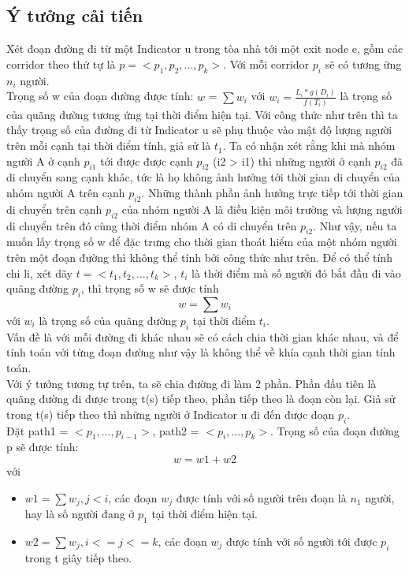 \documentclass{my_style}
\begin{document}
    \subsection{Ý tưởng cải tiến}
    Xét đoạn đường đi từ một Indicator u trong tòa nhà tới một exit 
    node e, gồm các corridor theo thứ tự là $p = <p_{1}, p_{2}, ...,p_{k}
    >$. Với mỗi corridor $p_{i}$ sẽ có tương ững $n_{i}$ người. \\ 
    Trọng số w của đoạn đường được tính: $w$ = $\sum{w_{i}}$ với 
    $w_{i} = \frac{L_{i}*g(D_{i})}{f(T_{i})}$ là trọng số của quãng 
    đường tương ứng tại thời điểm hiện tại. Với công thức như trên 
    thì ta thấy trọng số của đường đi từ Indicator u sẽ phụ thuộc vào mật độ lượng
    người trên mỗi cạnh tại thời điểm tính, giả sử là $t_{1}$.
    Ta có nhận xét rằng khi mà nhóm người A ở cạnh $p_{i1}$ tới 
    được được cạnh $p_{i2}$ (i2 > i1) thì những người ở cạnh 
    $p_{i2}$ đã di chuyển sang cạnh khác, tức là họ không ảnh hưởng 
    tới thời gian di chuyển của nhóm người A trên cạnh $p_{i2}$. Những 
    thành phần ảnh hưởng trực tiếp tới thời gian di chuyển trên cạnh 
    $p_{i2}$ của nhóm người A là điều kiện môi trường và lượng người 
    di chuyển trên đó cùng thời điểm nhóm A có di chuyển trên $p_{i2}$. 
    Như vậy, nếu ta muốn 
    lấy trọng số w để đặc trưng cho thời gian thoát hiểm của một
    nhóm người trên một đoạn đường thì không thể tính bởi công thức 
    như trên. Để có thể tính chi li, xét dãy $t = <t_{1}, t_{2},
    ..., t_{k}>$, $t_{i}$ là thời điểm mà số người đó bắt đầu đi vào
    quãng đường $p_{i}$, thì trọng số w sẽ được tính 
    \begin{equation}
        w = \sum{w_{i}}
    \end{equation}  
    với $w_{i}$ là trọng số của quãng đường $p_{i}$ tại thời điểm 
    $t_{i}$. \\
    Vấn đề là với mỗi đường đi khác nhau sẽ có cách chia thời gian 
    khác nhau, và để tính toán với từng đoạn đường như vậy là không 
    thể về khía cạnh thời gian tính toán. \\ 
    Với ý tưởng tương tự trên, ta sẽ chia đường đi làm 2 phần. 
    Phần đầu tiên là quãng đường đi được trong t(s) tiếp theo, 
    phần tiếp theo là đoạn còn lại. Giả sử trong t(s) tiếp theo 
    thì những người ở Indicator u đi đến được đoạn $p_{i}$. \\
    Đặt path1 = $<p_{1}, ..., p_{i-1}>$, path2 = $<p_{i}, ..., p_{k}
    >$. Trọng số của đoạn đường p sẽ được tính: 
    \begin{equation}
        w = w1 + w2 
    \end{equation}
    với \begin{itemize}
        \item $w1 = \sum{w_{j}}, j < i$, các đoạn $w_{j}$ được
        tính với số người trên đoạn là $n_{1}$ người, hay là số 
        người đang ở $p_{1}$ tại thời điểm hiện tại.
        \item $w2 = \sum{w_{j}}, i <= j <= k$, các đoạn $w_{j}$
        được tính với số người tới được $p_{i}$ trong t giây 
        tiếp theo.
    \end{itemize}
\end{document}
